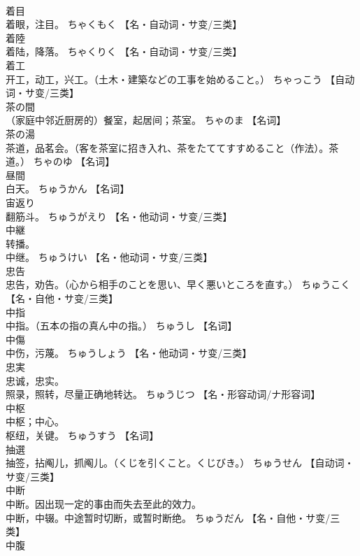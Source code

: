 \documentclass[8pt]{extreport}
\begin{document}
\begin{CJK}{UTF8}{min}
\\	着目	
\\	着眼，注目。	ちゃくもく		【名・自动词・サ变/三类】
\\	着陸	
\\	着陆，降落。	ちゃくりく		【名・自动词・サ变/三类】
\\	着工	
\\	开工，动工，兴工。（土木・建築などの工事を始めること。）	ちゃっこう		【自动词・サ变/三类】
\\	茶の間	
\\	（家庭中邻近厨房的）餐室，起居间；茶室。	ちゃのま		【名词】
\\	茶の湯	
\\	茶道，品茗会。（客を茶室に招き入れ、茶をたててすすめること（作法）。茶道。）	ちゃのゆ		【名词】
\\	昼間	
\\	白天。	ちゅうかん		【名词】
\\	宙返り	
\\	翻筋斗。	ちゅうがえり		【名・他动词・サ变/三类】
\\	中継	
\\	转播。 
\\	中继。	ちゅうけい		【名・他动词・サ变/三类】
\\	忠告	
\\	忠告，劝告。（心から相手のことを思い、早く悪いところを直す。）	ちゅうこく		【名・自他・サ变/三类】
\\	中指	
\\	中指。（五本の指の真ん中の指。）	ちゅうし		【名词】
\\	中傷	
\\	中伤，污蔑。	ちゅうしょう		【名・他动词・サ变/三类】
\\	忠実	
\\	忠诚，忠实。 
\\	照录，照转，尽量正确地转达。	ちゅうじつ		【名・形容动词/ナ形容词】
\\	中枢	
\\	中枢；中心。 
\\	枢纽，关键。	ちゅうすう		【名词】
\\	抽選	
\\	抽签，拈阄儿，抓阄儿。（くじを引くこと。くじびき。）	ちゅうせん		【自动词・サ变/三类】
\\	中断	
\\	中断。因出现一定的事由而失去至此的效力。 
\\	中断，中辍。中途暂时切断，或暂时断绝。	ちゅうだん		【名・自他・サ变/三类】
\\	中腹	

\end{CJK}
\end{document}
